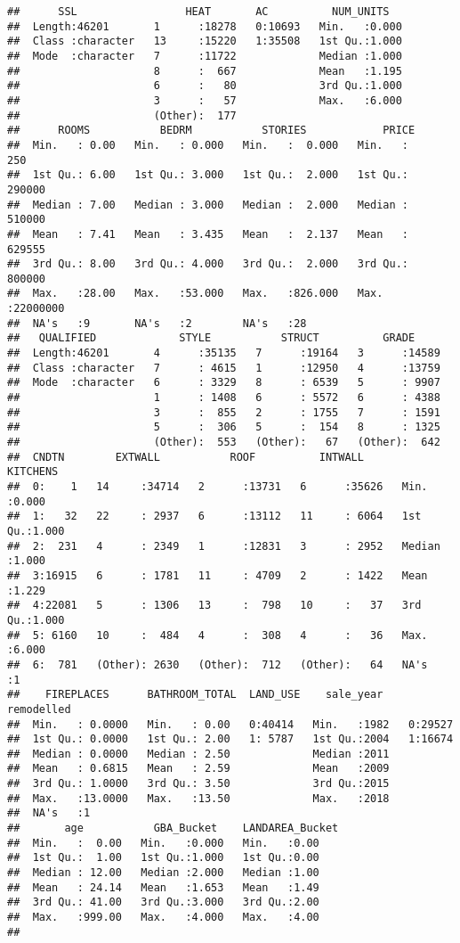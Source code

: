 \documentclass[]{article}
\begin{document}
\begin{verbatim}
##      SSL                 HEAT       AC          NUM_UNITS    
##  Length:46201       1      :18278   0:10693   Min.   :0.000  
##  Class :character   13     :15220   1:35508   1st Qu.:1.000  
##  Mode  :character   7      :11722             Median :1.000  
##                     8      :  667             Mean   :1.195  
##                     6      :   80             3rd Qu.:1.000  
##                     3      :   57             Max.   :6.000  
##                     (Other):  177                            
##      ROOMS           BEDRM           STORIES            PRICE         
##  Min.   : 0.00   Min.   : 0.000   Min.   :  0.000   Min.   :     250  
##  1st Qu.: 6.00   1st Qu.: 3.000   1st Qu.:  2.000   1st Qu.:  290000  
##  Median : 7.00   Median : 3.000   Median :  2.000   Median :  510000  
##  Mean   : 7.41   Mean   : 3.435   Mean   :  2.137   Mean   :  629555  
##  3rd Qu.: 8.00   3rd Qu.: 4.000   3rd Qu.:  2.000   3rd Qu.:  800000  
##  Max.   :28.00   Max.   :53.000   Max.   :826.000   Max.   :22000000  
##  NA's   :9       NA's   :2        NA's   :28                          
##   QUALIFIED             STYLE           STRUCT          GRADE      
##  Length:46201       4      :35135   7      :19164   3      :14589  
##  Class :character   7      : 4615   1      :12950   4      :13759  
##  Mode  :character   6      : 3329   8      : 6539   5      : 9907  
##                     1      : 1408   6      : 5572   6      : 4388  
##                     3      :  855   2      : 1755   7      : 1591  
##                     5      :  306   5      :  154   8      : 1325  
##                     (Other):  553   (Other):   67   (Other):  642  
##  CNDTN        EXTWALL           ROOF          INTWALL         KITCHENS    
##  0:    1   14     :34714   2      :13731   6      :35626   Min.   :0.000  
##  1:   32   22     : 2937   6      :13112   11     : 6064   1st Qu.:1.000  
##  2:  231   4      : 2349   1      :12831   3      : 2952   Median :1.000  
##  3:16915   6      : 1781   11     : 4709   2      : 1422   Mean   :1.229  
##  4:22081   5      : 1306   13     :  798   10     :   37   3rd Qu.:1.000  
##  5: 6160   10     :  484   4      :  308   4      :   36   Max.   :6.000  
##  6:  781   (Other): 2630   (Other):  712   (Other):   64   NA's   :1      
##    FIREPLACES      BATHROOM_TOTAL  LAND_USE    sale_year    remodelled
##  Min.   : 0.0000   Min.   : 0.00   0:40414   Min.   :1982   0:29527   
##  1st Qu.: 0.0000   1st Qu.: 2.00   1: 5787   1st Qu.:2004   1:16674   
##  Median : 0.0000   Median : 2.50             Median :2011             
##  Mean   : 0.6815   Mean   : 2.59             Mean   :2009             
##  3rd Qu.: 1.0000   3rd Qu.: 3.50             3rd Qu.:2015             
##  Max.   :13.0000   Max.   :13.50             Max.   :2018             
##  NA's   :1                                                            
##       age           GBA_Bucket    LANDAREA_Bucket
##  Min.   :  0.00   Min.   :0.000   Min.   :0.00   
##  1st Qu.:  1.00   1st Qu.:1.000   1st Qu.:0.00   
##  Median : 12.00   Median :2.000   Median :1.00   
##  Mean   : 24.14   Mean   :1.653   Mean   :1.49   
##  3rd Qu.: 41.00   3rd Qu.:3.000   3rd Qu.:2.00   
##  Max.   :999.00   Max.   :4.000   Max.   :4.00   
## 
\end{verbatim}
\end{document}
